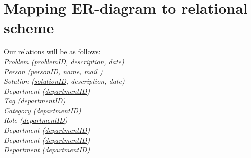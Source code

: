 \section{Mapping ER-diagram to relational scheme}
\label{sec:map_er_rel}

Our relations will be as follows:\\

\textit{Problem (\underline{problemID}, description, date)} \\
\textit{Person (\underline{personID}, name, mail )} \\
\textit{Solution (\underline{solutionID}, description, date)} \\
\textit{Department (\underline{departmentID})} \\
\textit{Tag (\underline{departmentID})} \\
\textit{Category (\underline{departmentID})} \\
\textit{Role (\underline{departmentID})} \\
\textit{Department (\underline{departmentID})} \\
\textit{Department (\underline{departmentID})} \\
\textit{Department (\underline{departmentID})} \\



